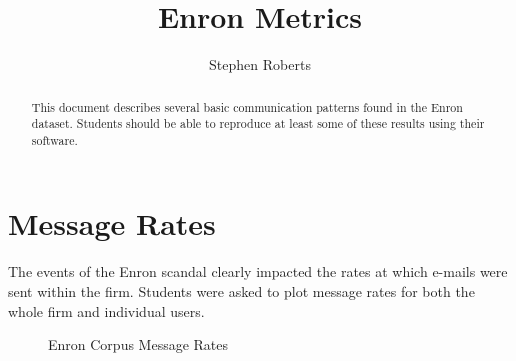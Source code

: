 \documentclass[a4paper]{article}
\title{Enron Metrics}
\author{Stephen Roberts}
\begin{document}
\maketitle
\begin{abstract}
  This document describes several basic communication patterns found in the Enron dataset.
  Students should be able to reproduce at least some of these results using their software.
\end{abstract}

\section{Message Rates}
The events of the Enron scandal clearly impacted the rates at which e-mails were sent within the firm.
Students were asked to plot message rates for both the whole firm and individual users. 

\begin{figure}
\centering

\caption{Enron Corpus Message Rates}
\label{fig:technique}
\end{figure}
\end{document}
